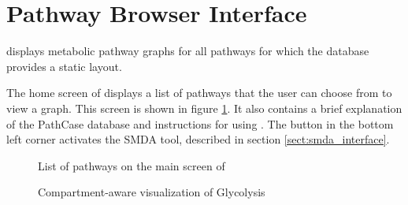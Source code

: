\section{Pathway Browser Interface}
\label{sect:maw_interface}

\mawapp displays metabolic pathway graphs for all pathways for which the
\pathcasemaw database provides a static layout.

The home screen of \mawapp displays a list of pathways that the user can choose
from to view a graph. This screen is shown in figure
\ref{fig:maw_screenshot_list}. It also contains a brief explanation of the
PathCase database and instructions for using \mawapp. The button in the bottom
left corner activates the SMDA tool, described in section
\ref{sect:smda_interface}.

\begin{figure}[htbp]
    \caption{\label{fig:maw_screenshot_list} List of pathways on the main screen
    of \mawapp}
\end{figure}

\begin{figure}[hbtp]
    \caption{\label{fig:maw_screenshot_pathway} Compartment-aware visualization
    of Glycolysis}
\end{figure}

